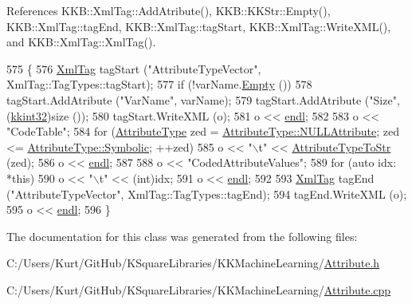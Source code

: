 References K\+K\+B\+::\+Xml\+Tag\+::\+Add\+Atribute(), K\+K\+B\+::\+K\+K\+Str\+::\+Empty(), K\+K\+B\+::\+Xml\+Tag\+::tag\+End, K\+K\+B\+::\+Xml\+Tag\+::tag\+Start, K\+K\+B\+::\+Xml\+Tag\+::\+Write\+X\+M\+L(), and K\+K\+B\+::\+Xml\+Tag\+::\+Xml\+Tag().


\begin{DoxyCode}
575 \{
576   \hyperlink{class_k_k_b_1_1_xml_tag}{XmlTag}  tagStart (\textcolor{stringliteral}{"AttributeTypeVector"}, XmlTag::TagTypes::tagStart);
577   \textcolor{keywordflow}{if}  (!varName.\hyperlink{class_k_k_b_1_1_k_k_str_ac69942f73fffd672ec2a6e1c410afdb6}{Empty} ())
578     tagStart.AddAtribute (\textcolor{stringliteral}{"VarName"}, varName);
579   tagStart.AddAtribute (\textcolor{stringliteral}{"Size"}, (\hyperlink{namespace_k_k_b_a8fa4952cc84fda1de4bec1fbdd8d5b1b}{kkint32})size ());
580   tagStart.WriteXML (o);
581   o << \hyperlink{namespace_k_k_b_ad1f50f65af6adc8fa9e6f62d007818a8}{endl};
582 
583   o << \textcolor{stringliteral}{"CodeTable"};
584   \textcolor{keywordflow}{for}  (\hyperlink{namespace_k_k_m_l_l_a99973706982b59debba670e2480555ab}{AttributeType}  zed = \hyperlink{namespace_k_k_m_l_l_a99973706982b59debba670e2480555abad76980f2bce5d0db714f2b125268dd6c}{AttributeType::NULLAttribute};  zed <=
       \hyperlink{namespace_k_k_m_l_l_a99973706982b59debba670e2480555abaaddee1396a3e20ceea8071ed6da54866}{AttributeType::Symbolic};  ++zed)
585     o << \textcolor{stringliteral}{"\(\backslash\)t"} << \hyperlink{namespace_k_k_m_l_l_a922b2d3446540a65714bf7387d90e6e2}{AttributeTypeToStr} (zed);
586   o << \hyperlink{namespace_k_k_b_ad1f50f65af6adc8fa9e6f62d007818a8}{endl};
587 
588   o << \textcolor{stringliteral}{"CodedAttributeValues"};
589   \textcolor{keywordflow}{for}  (\textcolor{keyword}{auto}  idx: *\textcolor{keyword}{this})
590     o << \textcolor{stringliteral}{"\(\backslash\)t"} << (int)idx;
591   o << \hyperlink{namespace_k_k_b_ad1f50f65af6adc8fa9e6f62d007818a8}{endl};
592 
593   \hyperlink{class_k_k_b_1_1_xml_tag}{XmlTag}  tagEnd (\textcolor{stringliteral}{"AttributeTypeVector"}, XmlTag::TagTypes::tagEnd);
594   tagEnd.WriteXML (o);
595   o << \hyperlink{namespace_k_k_b_ad1f50f65af6adc8fa9e6f62d007818a8}{endl};
596 \}
\end{DoxyCode}


The documentation for this class was generated from the following files\+:\begin{DoxyCompactItemize}
\item 
C\+:/\+Users/\+Kurt/\+Git\+Hub/\+K\+Square\+Libraries/\+K\+K\+Machine\+Learning/\hyperlink{_attribute_8h}{Attribute.\+h}\item 
C\+:/\+Users/\+Kurt/\+Git\+Hub/\+K\+Square\+Libraries/\+K\+K\+Machine\+Learning/\hyperlink{_attribute_8cpp}{Attribute.\+cpp}\end{DoxyCompactItemize}
